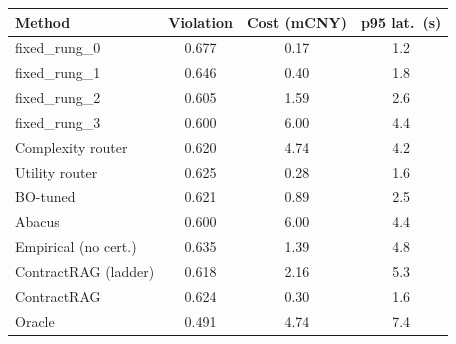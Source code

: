 \begin{tabular}{lccc}
\toprule
Method & Violation & Cost (mCNY) & p95 lat.\ (s) \\
\midrule
fixed_rung_0 & 0.677 & 0.17 & 1.2 \\
fixed_rung_1 & 0.646 & 0.40 & 1.8 \\
fixed_rung_2 & 0.605 & 1.59 & 2.6 \\
fixed_rung_3 & 0.600 & 6.00 & 4.4 \\
Complexity router & 0.620 & 4.74 & 4.2 \\
Utility router & 0.625 & 0.28 & 1.6 \\
BO-tuned & 0.621 & 0.89 & 2.5 \\
Abacus & 0.600 & 6.00 & 4.4 \\
Empirical (no cert.) & 0.635 & 1.39 & 4.8 \\
ContractRAG (ladder) & 0.618 & 2.16 & 5.3 \\
ContractRAG & 0.624 & 0.30 & 1.6 \\
Oracle & 0.491 & 4.74 & 7.4 \\
\bottomrule
\end{tabular}